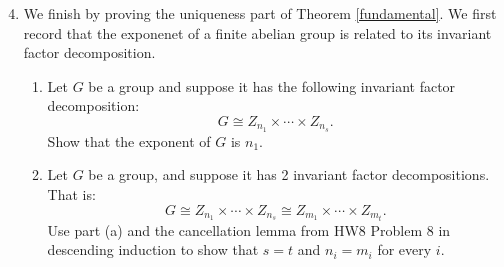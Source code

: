 \documentclass[11pt]{article}
\begin{document}
\begin{enumerate}
  \setcounter{enumi}{3}
  \item{
  We finish by proving the uniqueness part of Theorem \ref{fundamental}.  We first record that the exponenet of a finite abelian group is related to its invariant factor decomposition.
  \begin{enumerate}
    \item{
    Let $G$ be a group and suppose it has the following invariant factor decomposition:
    \[G \cong Z_{n_1}\times\cdots\times Z_{n_s}.\]
    Show that the exponent of $G$ is $n_1$.
    }
    \item{
    Let $G$ be a group, and suppose it has 2 invariant factor decompositions.  That is:
    \[G \cong Z_{n_1}\times\cdots\times Z_{n_s}\cong Z_{m_1}\times\cdots\times Z_{m_t}.\]
    Use part (a) and the cancellation lemma from HW8 Problem 8 in descending induction to show that $s=t$ and $n_i=m_i$ for every $i$.
    }
  \end{enumerate}
  }
\end{enumerate}
\end{document}
